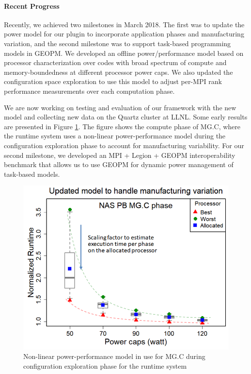 \paragraph{Recent Progress}
Recently, we achieved two milestones in March 2018. The first was to update the power model for our plugin to incorporate application phases and manufacturing variation, and the second milestone was to support task-based programming models in GEOPM. We developed an offline power/performance model based on processor characterization over codes with broad spectrum of compute and memory-boundedness at different processor power caps. We also updated the configuration space exploration to use this model to adjust per-MPI rank performance measurements over each computation phase. 

We are now working on testing and evaluation of our framework with the new model and collecting new data on the Quartz cluster at LLNL. Some early results are presented in Figure \ref{fig:MG}. The figure shows the compute phase of MG.C, where the runtime system uses a non-linear power-performance model during the configuration exploration phase to account for manufacturing variability. For our second milestone, we developed an MPI + Legion + GEOPM interoperability benchmark that allows us to use GEOPM for dynamic power management of task-based models. 

\begin{figure}[t]
	\centering
	\includegraphics[scale = 0.6]{projects/2.3.1-PMR/2.3.1.12-Power-Steering/power_model.png}
	\caption{Non-linear power-performance model in use for MG.C during configuration exploration phase for the runtime system}
	\label{fig:MG}
\end{figure}


